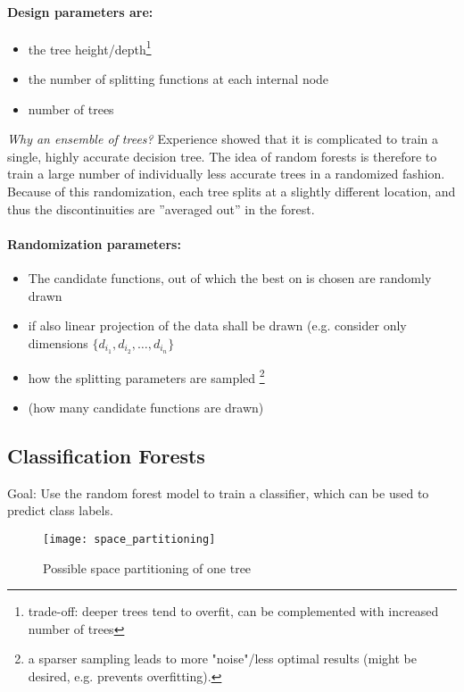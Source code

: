 \paragraph{Design parameters are:}
\begin{itemize}
  \item the tree height/depth\footnote{ trade-off: deeper trees tend to overfit, can be complemented with increased number of trees}
  \item the number of splitting functions at each internal node
  \item number of trees
\end{itemize}

\textit{Why an ensemble of trees?} Experience showed that it is complicated to train a single, highly accurate decision tree. The idea of random forests is therefore to train a large number of individually less accurate trees in a randomized fashion. Because of this randomization, each tree splits at a slightly different location, and thus the discontinuities are ”averaged out” in the forest.

\paragraph{Randomization parameters:}
\begin{itemize}
  \item The candidate functions, out of which the best on is chosen  are randomly drawn
  \item if also linear projection of the data shall be drawn (e.g. consider only dimensions \(\{d_{i_1}, d_{i_2}, \dots, d_{i_n}\}\)
  \item how the splitting parameters are sampled \footnote{a sparser sampling leads to more "noise"/less optimal results (might be desired, e.g. prevents overfitting).}
  \item (how many candidate functions are drawn)
\end{itemize}

\newpage
\subsection*{Classification Forests}
Goal: Use the random forest model to train a classifier, which can be used to predict class labels.

\begin{figure}[H]
  \centering
  \texttt{[image: space\_partitioning]}
  \caption{Possible space partitioning of one tree}
\end{figure}

